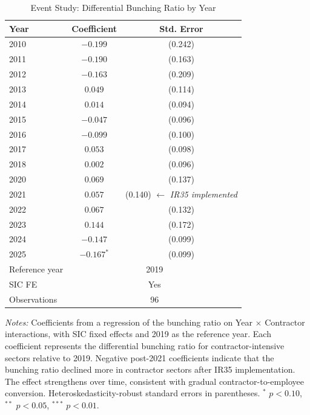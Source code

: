 \begin{table}[htbp]
\centering
\caption{Event Study: Differential Bunching Ratio by Year}
\label{tab:event}
\begin{tabular}{lcc}
\hline\hline
Year & Coefficient & Std. Error \\
\hline
2010 & $-0.199$ & (0.242) \\
2011 & $-0.190$ & (0.163) \\
2012 & $-0.163$ & (0.209) \\
2013 & $0.049$ & (0.114) \\
2014 & $0.014$ & (0.094) \\
2015 & $-0.047$ & (0.096) \\
2016 & $-0.099$ & (0.100) \\
2017 & $0.053$ & (0.098) \\
2018 & $0.002$ & (0.096) \\
2020 & $0.069$ & (0.137) \\
2021 & $0.057$ & (0.140) $\leftarrow$ \textit{IR35 implemented} \\
2022 & $0.067$ & (0.132) \\
2023 & $0.144$ & (0.172) \\
2024 & $-0.147$ & (0.099) \\
2025 & $-0.167^{*}$ & (0.099) \\
\hline
Reference year & \multicolumn{2}{c}{2019} \\
SIC FE & \multicolumn{2}{c}{Yes} \\
Observations & \multicolumn{2}{c}{96} \\
\hline\hline
\end{tabular}
\begin{tablenotes}
\item \textit{Notes:} Coefficients from a regression of the bunching ratio on Year $\times$ Contractor interactions, with SIC fixed effects and 2019 as the reference year. Each coefficient represents the differential bunching ratio for contractor-intensive sectors relative to 2019. Negative post-2021 coefficients indicate that the bunching ratio declined more in contractor sectors after IR35 implementation. The effect strengthens over time, consistent with gradual contractor-to-employee conversion. Heteroskedasticity-robust standard errors in parentheses. $^{*}$ $p<0.10$, $^{**}$ $p<0.05$, $^{***}$ $p<0.01$.
\end{tablenotes}
\end{table}
